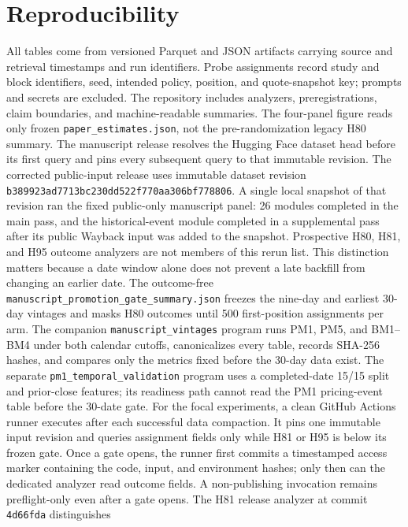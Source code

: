 \documentclass[11pt]{article}
\newcommand{\1}{\mathbf{1}}
\begin{document}
\section{Reproducibility}
\label{app:repro}

All tables come from versioned Parquet and JSON artifacts carrying source and
retrieval timestamps and run identifiers.  Probe assignments record study and
block identifiers, seed, intended policy, position, and quote-snapshot key;
prompts and secrets are excluded.  The repository includes analyzers,
preregistrations, claim boundaries, and machine-readable summaries.  The
four-panel figure reads only frozen \texttt{paper\_estimates.json}, not the
pre-randomization legacy H80 summary.  The manuscript release resolves the
Hugging Face dataset head before its first query and pins every subsequent query
to that immutable revision.  The corrected public-input release uses immutable
dataset revision
\nolinkurl{b389923ad7713bc230dd522f770aa306bf778806}.  A single local snapshot of
that revision ran the fixed public-only manuscript panel: 26 modules completed in
the main pass, and the historical-event module completed in a supplemental pass
after its public Wayback input was added to the snapshot.  Prospective H80, H81,
and H95 outcome analyzers are not members of this rerun list.  This distinction
matters because a date window alone does not prevent a late backfill from changing
an earlier date.
The outcome-free
\texttt{manuscript\_promotion\_gate\_summary.json} freezes the nine-day and
earliest 30-day vintages and masks H80 outcomes until 500 first-position
assignments per arm.  The companion \texttt{manuscript\_vintages} program runs
PM1, PM5, and BM1--BM4 under both calendar cutoffs, canonicalizes every table, records
SHA-256 hashes, and compares only the metrics fixed before the 30-day data exist.
The separate \texttt{pm1\_temporal\_validation} program uses a completed-date
15/15 split and prior-close features; its readiness path cannot read the PM1
pricing-event table before the 30-date gate.
For the focal experiments, a clean GitHub Actions runner executes after each
successful data compaction.  It pins one immutable input revision and queries
assignment fields only while H81 or H95 is below its frozen gate.  Once a gate
opens, the runner first commits a timestamped access marker containing the code,
input, and environment hashes; only then can the dedicated analyzer read outcome
fields.  A non-publishing invocation remains preflight-only even after a gate
opens.  The H81 release analyzer at commit \texttt{4d66fda} distinguishes
\end{document}

